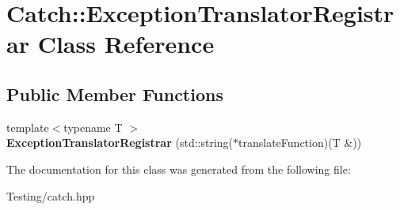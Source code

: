 \hypertarget{class_catch_1_1_exception_translator_registrar}{\section{Catch\-:\-:Exception\-Translator\-Registrar Class Reference}
\label{class_catch_1_1_exception_translator_registrar}
}
\subsection*{Public Member Functions}
\begin{DoxyCompactItemize}
\item 
\hypertarget{class_catch_1_1_exception_translator_registrar_aa73229de911f26b1df6c6c87c4d9e04e}{{\footnotesize template$<$typename T $>$ }\\{\bfseries Exception\-Translator\-Registrar} (std\-::string($\ast$translate\-Function)(T \&))}\label{class_catch_1_1_exception_translator_registrar_aa73229de911f26b1df6c6c87c4d9e04e}

\end{DoxyCompactItemize}


The documentation for this class was generated from the following file\-:\begin{DoxyCompactItemize}
\item 
Testing/catch.\-hpp\end{DoxyCompactItemize}
